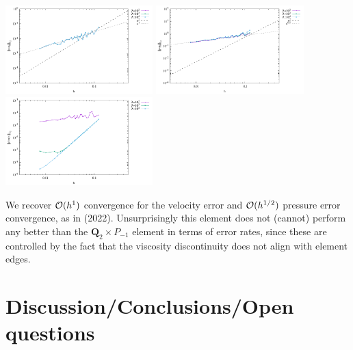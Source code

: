 \begin{center}
\includegraphics[width=5.7cm]{python_codes/fieldstone_161/results/bench4/errorsV.pdf}
\includegraphics[width=5.7cm]{python_codes/fieldstone_161/results/bench4/errorsP.pdf}
\includegraphics[width=5.7cm]{python_codes/fieldstone_161/results/bench4/errorsDivv.pdf}
\end{center}
We recover ${\cal O}(h^1)$ convergence for the velocity error and ${\cal O}(h^{1/2})$ 
pressure error convergence, as in \textcite{thba22} (2022).
Unsurprisingly this element does not (cannot) perform any better than
the ${\bm Q}_2 \times P_{-1}$ element in terms of error rates, since these are
controlled by the fact that the viscosity discontinuity does not align with
element edges.




\newpage
\section*{Discussion/Conclusions/Open questions}

